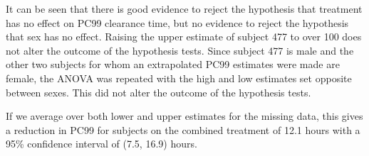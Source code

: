 It can be seen that there is good evidence to reject the hypothesis that treatment has no effect on PC99 clearance time, but no evidence to reject the hypothesis that sex has no effect. Raising the upper estimate of subject 477 to over 100 does not alter the outcome of the hypothesis tests. Since subject 477 is male and the other two subjects for whom an extrapolated PC99 estimates were made are female, the ANOVA was repeated with the high and low estimates set opposite between sexes. This did not alter the outcome of the hypothesis tests.

If we average over both lower and upper estimates for the missing data, this gives a reduction in PC99 for subjects on the combined treatment of 12.1 hours with a 95\% confidence interval of (7.5, 16.9) hours.



